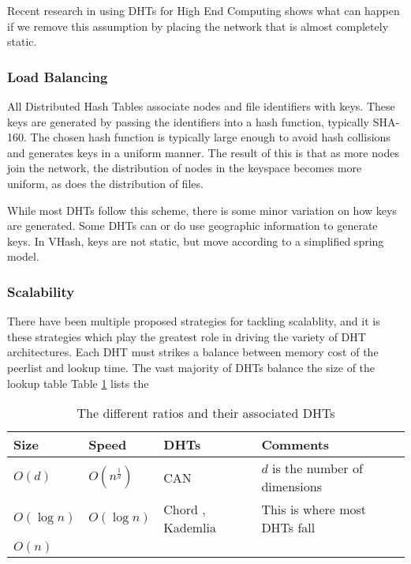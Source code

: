 \documentclass[10pt,letterpaper]{report}
\begin{document}
Recent research in using DHTs for High End Computing \cite{li2013zht} shows what can happen if we remove this assumption by placing the network that is almost completely static.



\subsubsection{Load Balancing}
All Distributed Hash Tables associate nodes and file identifiers with keys.  
These keys are generated by passing the identifiers into a hash function, typically SHA-160.
The chosen hash function is typically large enough to avoid hash collisions and generates keys in a uniform manner. 
The result of this is that as more nodes join the network, the distribution of nodes in the keyspace becomes more uniform, as does the distribution of files.

While most DHTs follow this scheme, there is some minor variation on how keys are generated.
Some DHTs can or do use geographic information to generate keys.
In VHash, keys are not static, but move according to a simplified spring model.

\subsubsection{Scalability}
There have been multiple proposed strategies for tackling scalablity, and it is these strategies which play the greatest role in driving the variety of DHT architectures. 
Each DHT must strikes a balance between memory cost of the peerlist and lookup time. 
The vast majority of DHTs balance the size of the lookup table
Table \ref{tab:tradeoffs} lists the 


\begin{table}
  \centering
  \begin{tabular}{|l|l|l|l|}
  \hline
  Size & Speed & DHTs & Comments \\ \hline
  
  $O(d)$ & $O(n^{\frac{1}{d}})$ & CAN \cite{can} & $d$ is the number of dimensions \\ \hline
  
  $O(\log n)$ & $O(\log n)$ & Chord \cite{chord}, Kademlia \cite{kademlia} & This is where most DHTs fall \\ \hline
  
  $O(n)$ &  & & \\ \hline
  \end{tabular}
  \caption{The different ratios and their associated DHTs}
  \label{tab:tradeoffs}
\end{table}
\end{document}
